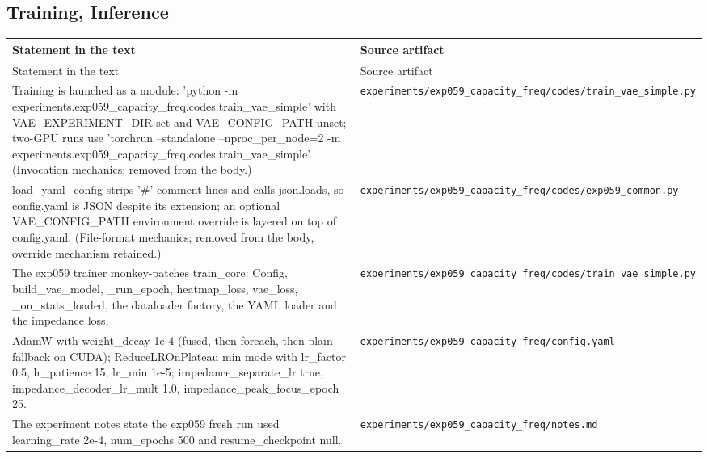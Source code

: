 \subsection*{Training, Inference}
\begingroup\small
\begin{longtable}{p{} p{}}
\hline
Statement in the text & Source artifact \\
\hline
\endfirsthead
\hline
Statement in the text & Source artifact \\
\hline
\endhead
Training is launched as a module: 'python -m experiments.exp059\_capacity\_freq.codes.train\_vae\_simple' with VAE\_EXPERIMENT\_DIR set and VAE\_CONFIG\_PATH unset; two-GPU runs use 'torchrun --standalone --nproc\_per\_node=2 -m experiments.exp059\_capacity\_freq.codes.train\_vae\_simple'. (Invocation mechanics; removed from the body.) & \texttt{experiments/\allowbreak{}exp059\_\allowbreak{}capacity\_\allowbreak{}freq/\allowbreak{}codes/\allowbreak{}train\_\allowbreak{}vae\_\allowbreak{}simple.py} \\
load\_yaml\_config strips '\#' comment lines and calls json.loads, so config.yaml is JSON despite its extension; an optional VAE\_CONFIG\_PATH environment override is layered on top of config.yaml. (File-format mechanics; removed from the body, override mechanism retained.) & \texttt{experiments/\allowbreak{}exp059\_\allowbreak{}capacity\_\allowbreak{}freq/\allowbreak{}codes/\allowbreak{}exp059\_\allowbreak{}common.py} \\
The exp059 trainer monkey-patches train\_core: Config, build\_vae\_model, \_run\_epoch, heatmap\_loss, vae\_loss, \_on\_stats\_loaded, the dataloader factory, the YAML loader and the impedance loss. & \texttt{experiments/\allowbreak{}exp059\_\allowbreak{}capacity\_\allowbreak{}freq/\allowbreak{}codes/\allowbreak{}train\_\allowbreak{}vae\_\allowbreak{}simple.py} \\
AdamW with weight\_decay 1e-4 (fused, then foreach, then plain fallback on CUDA); ReduceLROnPlateau min mode with lr\_factor 0.5, lr\_patience 15, lr\_min 1e-5; impedance\_separate\_lr true, impedance\_decoder\_lr\_mult 1.0, impedance\_peak\_focus\_epoch 25. & \texttt{experiments/\allowbreak{}exp059\_\allowbreak{}capacity\_\allowbreak{}freq/\allowbreak{}config.yaml} \\
The experiment notes state the exp059 fresh run used learning\_rate 2e-4, num\_epochs 500 and resume\_checkpoint null. & \texttt{experiments/\allowbreak{}exp059\_\allowbreak{}capacity\_\allowbreak{}freq/\allowbreak{}notes.md} \\

\end{longtable}
